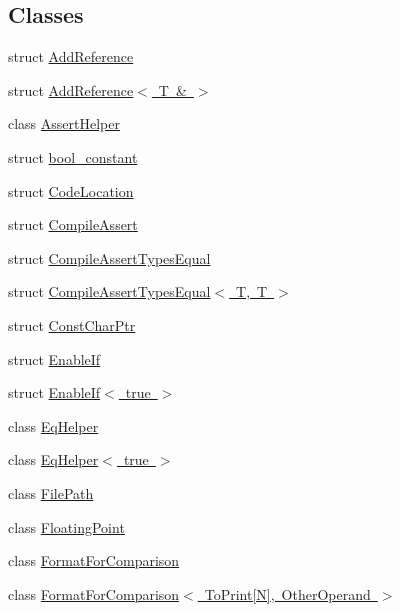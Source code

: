 \subsection*{Classes}
\begin{DoxyCompactItemize}
\item 
struct \mbox{\hyperlink{structtesting_1_1internal_1_1_add_reference}{Add\+Reference}}
\item 
struct \mbox{\hyperlink{structtesting_1_1internal_1_1_add_reference_3_01_t_01_6_01_4}{Add\+Reference$<$ T \& $>$}}
\item 
class \mbox{\hyperlink{classtesting_1_1internal_1_1_assert_helper}{Assert\+Helper}}
\item 
struct \mbox{\hyperlink{structtesting_1_1internal_1_1bool__constant}{bool\+\_\+constant}}
\item 
struct \mbox{\hyperlink{structtesting_1_1internal_1_1_code_location}{Code\+Location}}
\item 
struct \mbox{\hyperlink{structtesting_1_1internal_1_1_compile_assert}{Compile\+Assert}}
\item 
struct \mbox{\hyperlink{structtesting_1_1internal_1_1_compile_assert_types_equal}{Compile\+Assert\+Types\+Equal}}
\item 
struct \mbox{\hyperlink{structtesting_1_1internal_1_1_compile_assert_types_equal_3_01_t_00_01_t_01_4}{Compile\+Assert\+Types\+Equal$<$ T, T $>$}}
\item 
struct \mbox{\hyperlink{structtesting_1_1internal_1_1_const_char_ptr}{Const\+Char\+Ptr}}
\item 
struct \mbox{\hyperlink{structtesting_1_1internal_1_1_enable_if}{Enable\+If}}
\item 
struct \mbox{\hyperlink{structtesting_1_1internal_1_1_enable_if_3_01true_01_4}{Enable\+If$<$ true $>$}}
\item 
class \mbox{\hyperlink{classtesting_1_1internal_1_1_eq_helper}{Eq\+Helper}}
\item 
class \mbox{\hyperlink{classtesting_1_1internal_1_1_eq_helper_3_01true_01_4}{Eq\+Helper$<$ true $>$}}
\item 
class \mbox{\hyperlink{classtesting_1_1internal_1_1_file_path}{File\+Path}}
\item 
class \mbox{\hyperlink{classtesting_1_1internal_1_1_floating_point}{Floating\+Point}}
\item 
class \mbox{\hyperlink{classtesting_1_1internal_1_1_format_for_comparison}{Format\+For\+Comparison}}
\item 
class \mbox{\hyperlink{classtesting_1_1internal_1_1_format_for_comparison_3_01_to_print[_n]_00_01_other_operand_01_4}{Format\+For\+Comparison$<$ To\+Print\mbox{[}\+N\mbox{]}, Other\+Operand $>$}}

\end{DoxyCompactItemize}
